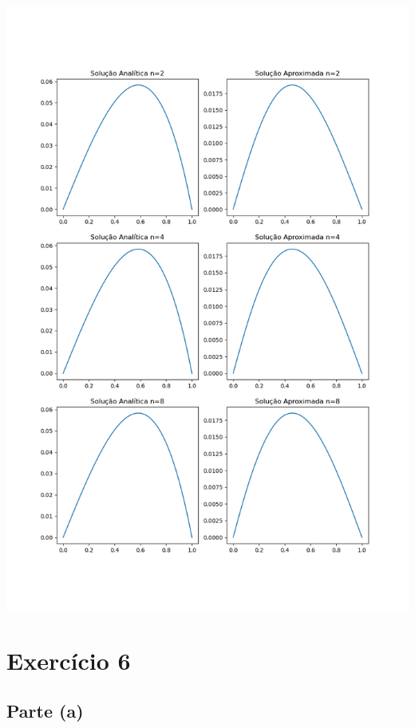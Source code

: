 \documentclass{article}
\begin{document}
\begin{center}
    \includegraphics[width=1\textwidth]{exercicio5.png}
\end{center}

\section{Exercício 6}
\subsection{Parte (a)}
\end{document}
